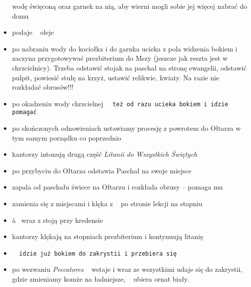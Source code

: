 \begin{itemize}
	      wodę święconą oraz garnek na nią, aby wierni mogli sobie jej więcej
	      nabrać do domu
	\item {} podaje \ii~ oleje
	\item {} po nabraniu wody do kociołka i do garnka ucieka z pola widzenia
	      bokiem i zaczyna przygotowywać prezbiterium do Mszy (jeszcze jak
	      reszta jest w chrzcielnicy). Trzeba odstawić stojak na paschał na
	      stronę ewangelii, odstawić pulpit, powiesić stułę na krzyż, ustawić
	      relikwie, kwiaty. Na razie nie rozkładać obrusów!!!
	\item po okadzeniu wody chrzcielnej \tt~ też od razu ucieka bokiem i idzie
	      pomagać 
	\item po skończonych odnowieniach ustawiamy procesję z powrotem do Ołtarza w
	      tym samym porządku co poprzednio
	\item kantorzy intonują drugą część \textit{Litanii do Wszystkich Świętych}
	\item po przybyciu do Ołtarza  odstawia Paschał na swoje miejsce
	\item {} zapala od paschału świece na Ołtarzu i rozkłada obrusy -- pomaga
	      mu 
	\item {} zamienia się z  miejscami i klęka z \ii~ po stronie lekcji na
	      stopniu
	\item \aa~ wraz z  stoją przy kredensie
	\item kantorzy klękają na stopniach prezbiterium i kontynuują litanię
	\item \tt~ idzie już bokiem do zakrystii i przebiera się
	\item po wezwaniu \textit{Peccatores} \ii~ wstaje i wraz ze wszystkimi udaje
	      się do zakrystii, gdzie zmieniamy komże na ładniejsze, \ii~ ubiera
	      ornat biały.
\end{itemize}
